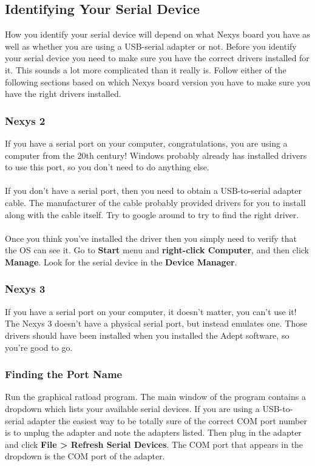 \documentclass[notitlepage]{article}
\begin{document}
\subsection{Identifying Your Serial Device}
\label{sec:serial_id}
How you identify your serial device will depend on what Nexys board you have as well as whether you are using a USB-serial adapter or not. Before you identify your serial device you need to make sure you have the correct drivers installed for it. This sounds a lot more complicated than it really is. Follow either of the following sections based on which Nexys board version you have to make sure you have the right drivers installed.

\subsubsection{Nexys 2}
If you have a serial port on your computer, congratulations, you are using a computer from the 20th century! Windows probably already has installed drivers to use this port, so you don't need to do anything else.\\\\
If you don't have a serial port, then you need to obtain a USB-to-serial adapter cable. The manufacturer of the cable probably provided drivers for you to install along with the cable itself. Try to google around to try to find the right driver.\\\\
Once you think you've installed the driver then you simply need to verify that the OS can see it. Go to \textbf{Start} menu and \textbf{right-click Computer}, and then click \textbf{Manage}. Look for the serial device in the \textbf{Device Manager}.

\subsubsection{Nexys 3}
If you have a serial port on your computer, it doesn't matter, you can't use it! The Nexys 3 doesn't have a physical serial port, but instead emulates one. Those drivers should have been installed when you installed the Adept software, so you're good to go.

\subsubsection{Finding the Port Name}
Run the graphical ratload program. The main window of the program contains a dropdown which lists your available serial devices. If you are using a USB-to-serial adapter the easiest way to be totally sure of the correct COM port number is to unplug the adapter and note the adapters listed. Then plug in the adapter and click \textbf{File > Refresh Serial Devices}. The COM port that appears in the dropdown is the COM port of the adapter.
\end{document}
